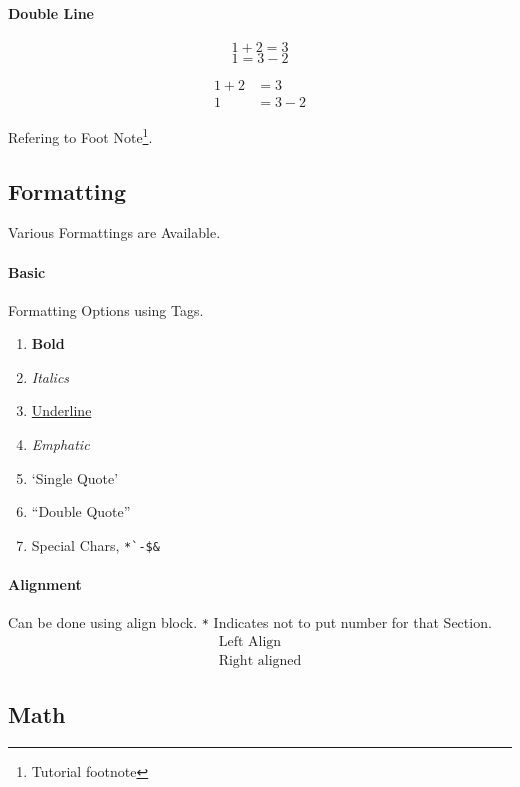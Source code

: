 \documentclass{article}[a4paper,12pt]
\begin{document}
\paragraph*{Double Line}

\begin{equation*}
  1 + 2 = 3 
\end{equation*}
\begin{equation*}
  1 = 3 - 2
\end{equation*}

\begin{align*}
  1 + 2 &= 3\\
  1 &= 3 - 2
\end{align*}

Refering to Foot Note\footnote{\label{myfootnote}Tutorial footnote}.

\subsection{Formatting}

Various Formattings are Available.
\paragraph{Basic} Formatting Options using Tags.
\begin{enumerate}
  \item \textbf{Bold}
  \item \textit{Italics}
  \item \underline{Underline}
  \item \emph{Emphatic}
  \item `Single Quote'
  \item ``Double Quote''
  \item Special Chars, \verb|*`-$&|
\end{enumerate}

\paragraph{Alignment} Can be done using align block. 
\verb|*| Indicates not to put number for that Section.
\begin{align*}
  \text{Left Align}\\
  \text{Right aligned}
\end{align*}

\subsection{Math}
\end{document}
